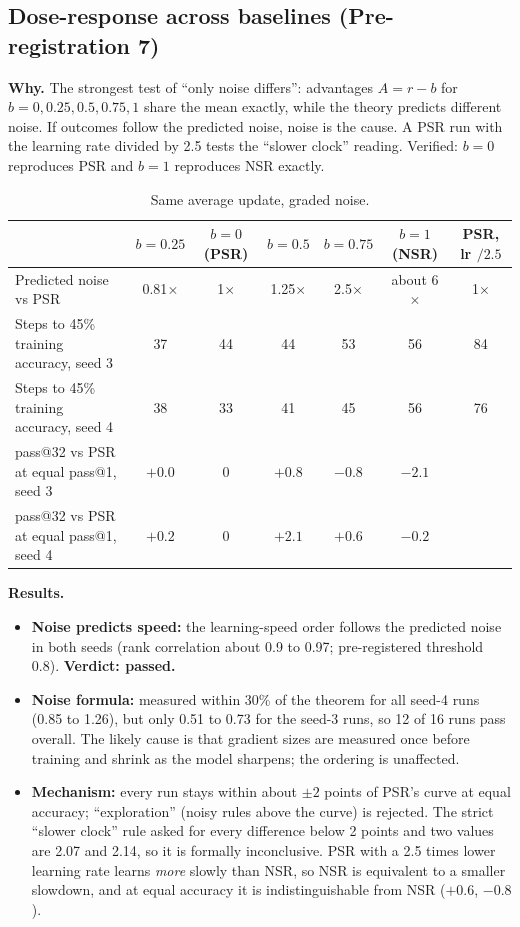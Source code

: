 \documentclass[11pt]{article}
\newcommand{\verdict}[1]{\textcolor{blue!50!black}{\textbf{Verdict: #1}}}
\begin{document}
\subsection{Dose-response across baselines (Pre-registration 7)}
\textbf{Why.} The strongest test of ``only noise differs'': advantages $A=r-b$ for $b=0,0.25,0.5,0.75,1$ share the mean exactly, while the theory predicts different noise. If outcomes follow the predicted noise, noise is the cause. A PSR run with the learning rate divided by 2.5 tests the ``slower clock'' reading. Verified: $b=0$ reproduces PSR and $b=1$ reproduces NSR exactly.

\begin{table}[H]
\centering\small
\begin{tabular}{@{}lcccccc@{}}
\toprule
& $b=0.25$ & $b=0$ (PSR) & $b=0.5$ & $b=0.75$ & $b=1$ (NSR) & PSR, lr $/2.5$\\
\midrule
Predicted noise vs PSR & 0.81$\times$ & 1$\times$ & 1.25$\times$ & 2.5$\times$ & about 6$\times$ & 1$\times$\\
Steps to 45\% training accuracy, seed 3 & 37 & 44 & 44 & 53 & 56 & 84\\
Steps to 45\% training accuracy, seed 4 & 38 & 33 & 41 & 45 & 56 & 76\\
pass@32 vs PSR at equal pass@1, seed 3 & $+0.0$ & 0 & $+0.8$ & $-0.8$ & $-2.1$ & \\
pass@32 vs PSR at equal pass@1, seed 4 & $+0.2$ & 0 & $+2.1$ & $+0.6$ & $-0.2$ & \\
\bottomrule
\end{tabular}
\caption{Same average update, graded noise.}
\end{table}

\textbf{Results.}
\begin{itemize}[leftmargin=*,itemsep=1pt]
\item \textbf{Noise predicts speed:} the learning-speed order follows the predicted noise in both seeds (rank correlation about 0.9 to 0.97; pre-registered threshold 0.8). \verdict{passed.}
\item \textbf{Noise formula:} measured within 30\% of the theorem for all seed-4 runs (0.85 to 1.26), but only 0.51 to 0.73 for the seed-3 runs, so 12 of 16 runs pass overall. The likely cause is that gradient sizes are measured once before training and shrink as the model sharpens; the ordering is unaffected.
\item \textbf{Mechanism:} every run stays within about $\pm2$ points of PSR's curve at equal accuracy; ``exploration'' (noisy rules above the curve) is rejected. The strict ``slower clock'' rule asked for every difference below 2 points and two values are 2.07 and 2.14, so it is formally inconclusive. PSR with a 2.5 times lower learning rate learns \emph{more} slowly than NSR, so NSR is equivalent to a smaller slowdown, and at equal accuracy it is indistinguishable from NSR ($+0.6$, $-0.8$).
\end{itemize}
\end{document}

